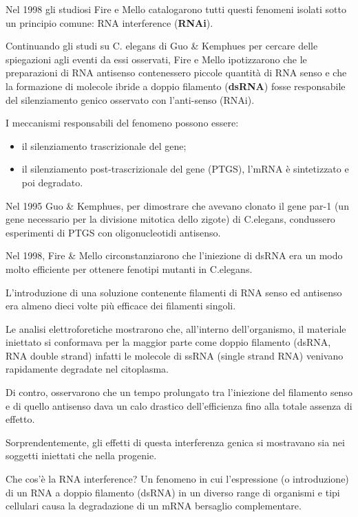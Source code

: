 \documentclass[11pt]{book}
\begin{document}
Nel 1998 gli studiosi Fire e Mello catalogarono tutti questi fenomeni
isolati sotto un principio comune: RNA interference (\textbf{RNAi}).

Continuando gli studi su C. elegans di Guo \& Kemphues per cercare delle
spiegazioni agli eventi da essi osservati, Fire e Mello ipotizzarono che
le preparazioni di RNA antisenso contenessero piccole quantità di RNA
senso e che la formazione di molecole ibride a doppio filamento
(\textbf{dsRNA}) fosse responsabile del silenziamento genico osservato
con l'anti-senso (RNAi).

I meccanismi responsabili del fenomeno possono essere:

\begin{itemize}
\itemsep1pt\parskip0pt
\item
  il silenziamento trascrizionale del gene;
\item
  il silenziamento post-trascrizionale del gene (PTGS), l'mRNA è
  sintetizzato e poi degradato.
\end{itemize}

Nel 1995 Guo \& Kemphues, per dimostrare che avevano clonato il gene
par-1 (un gene necessario per la divisione mitotica dello zigote) di
C.elegans, condussero esperimenti di PTGS con oligonucleotidi antisenso.

Nel 1998, Fire \& Mello circonstanziarono che l'iniezione di dsRNA era
un modo molto efficiente per ottenere fenotipi mutanti in C.elegans.

L'introduzione di una soluzione contenente filamenti di RNA senso ed
antisenso era almeno dieci volte più efficace dei filamenti singoli.

Le analisi elettroforetiche mostrarono che, all'interno dell'organismo,
il materiale iniettato si conformava per la maggior parte come doppio
filamento (dsRNA, RNA double strand) infatti le molecole di ssRNA
(single strand RNA) venivano rapidamente degradate nel citoplasma.

Di contro, osservarono che un tempo prolungato tra l'iniezione del
filamento senso e di quello antisenso dava un calo drastico
dell'efficienza fino alla totale assenza di effetto.

Sorprendentemente, gli effetti di questa interferenza genica si
mostravano sia nei soggetti iniettati che nella progenie.

Che cos'è la RNA interference? Un fenomeno in cui l'espressione (o
introduzione) di un RNA a doppio filamento (dsRNA) in un diverso range
di organismi e tipi cellulari causa la degradazione di un mRNA bersaglio
complementare.
\end{document}
